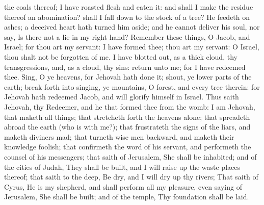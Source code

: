 the coals thereof; I have roasted flesh and eaten it: and shall I make the residue thereof an abomination? shall I fall down to the stock of a tree? He feedeth on ashes; a deceived heart hath turned him aside; and he cannot deliver his soul, nor say, Is there not a lie in my right hand?  Remember these things, O Jacob, and Israel; for thou art my servant: I have formed thee; thou art my servant: O Israel, thou shalt not be forgotten of me. I have blotted out, as a thick cloud, thy transgressions, and, as a cloud, thy sins: return unto me; for I have redeemed thee. Sing, O ye heavens, for Jehovah hath done it; shout, ye lower parts of the earth; break forth into singing, ye mountains, O forest, and every tree therein: for Jehovah hath redeemed Jacob, and will glorify himself in Israel.  Thus saith Jehovah, thy Redeemer, and he that formed thee from the womb: I am Jehovah, that maketh all things; that stretcheth forth the heavens alone; that spreadeth abroad the earth (who is with me?); that frustrateth the signs of the liars, and maketh diviners mad; that turneth wise men backward, and maketh their knowledge foolish; that confirmeth the word of his servant, and performeth the counsel of his messengers; that saith of Jerusalem, She shall be inhabited; and of the cities of Judah, They shall be built, and I will raise up the waste places thereof; that saith to the deep, Be dry, and I will dry up thy rivers; That saith of Cyrus, He is my shepherd, and shall perform all my pleasure, even saying of Jerusalem, She shall be built; and of the temple, Thy foundation shall be laid. 

